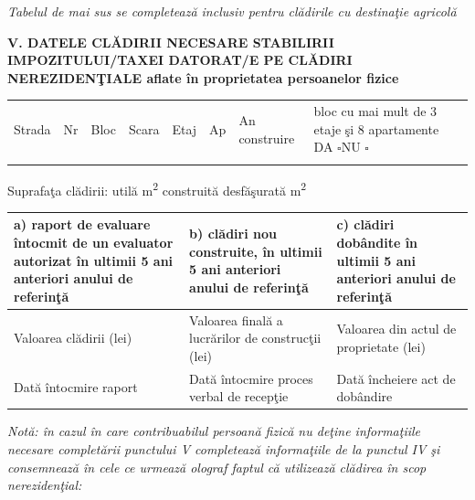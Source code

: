 \documentclass[8pt,a4paper,landscape]{extarticle}
\newcommand{\fillline}[1][6cm]{\underline{\hspace{#1}}}
\newcommand{\checkboxempty}{$\square$}
\begin{document}
\footnotesize\textit{Tabelul de mai sus se completează inclusiv pentru clădirile cu destinaţie agricolă}\normalsize

\vspace{0.15cm}

\textbf{V. DATELE CLĂDIRII NECESARE STABILIRII IMPOZITULUI/TAXEI DATORAT/E PE CLĂDIRI NEREZIDENŢIALE aflate în proprietatea persoanelor fizice}

\begin{tabularx}{\textwidth}{|X|X|X|X|X|X|X|X|}
\hline
Strada & Nr & Bloc & Scara & Etaj & Ap & An construire & bloc cu mai mult de 3 etaje şi 8 apartamente DA \checkboxempty \quad NU \checkboxempty \\
\fillline[3cm] & \fillline[1cm] & \fillline[1cm] & \fillline[1cm] & \fillline[1cm] & \fillline[1cm] & \fillline[2cm] & \\
\hline
\end{tabularx}

Suprafaţa clădirii: utilă \fillline[3cm] m\textsuperscript{2} \hspace{1cm} construită desfăşurată \fillline[3cm] m\textsuperscript{2}

\vspace{0.15cm}

\begin{tabularx}{\textwidth}{|X|X|X|}
\hline
\textbf{a)} raport de evaluare întocmit de un evaluator autorizat în ultimii 5 ani anteriori anului de referinţă & \textbf{b)} clădiri nou construite, în ultimii 5 ani anteriori anului de referinţă & \textbf{c)} clădiri dobândite în ultimii 5 ani anteriori anului de referinţă \\
\hline
Valoarea clădirii (lei) \fillline[4cm] & Valoarea finală a lucrărilor de construcţii (lei) \fillline[3cm] & Valoarea din actul de proprietate (lei) \fillline[3cm] \\
\hline
Dată întocmire raport \fillline[3cm] & Dată întocmire proces verbal de recepţie \fillline[3cm] & Dată încheiere act de dobândire \fillline[3cm] \\
\hline
\end{tabularx}

\vspace{0.15cm}

\footnotesize\textit{Notă: în cazul în care contribuabilul persoană fizică nu deţine informaţiile necesare completării punctului V completează informaţiile de la punctul IV şi consemnează în cele ce urmează olograf faptul că utilizează clădirea în scop nerezidenţial:}\normalsize
\end{document}

